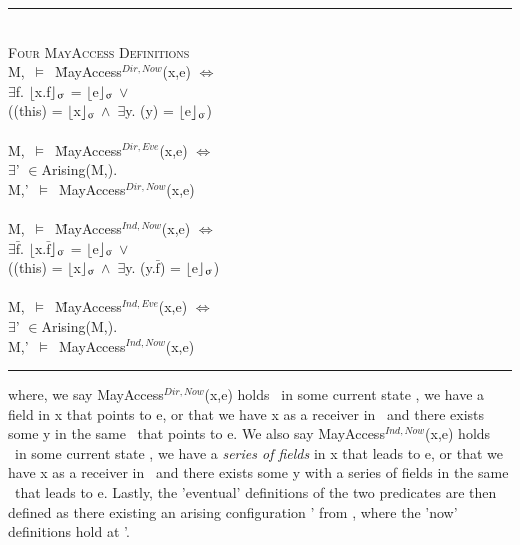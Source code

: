 \documentclass[a4paper,11pt, twoside,twocolumn]{article}
\newenvironment{logic}
{\begin{minipage}[c]{\linewidth}  \small \vspace{0.5em}\begin{tabbing}}
{\end{tabbing}\end{minipage}\vspace{0.5em}}
\newcommand{\loin}{$\in$}
\newcommand{\loexists}{$\exists$}
\newcommand{\loand}{$\land$}
\newcommand{\loor} {$\lor$}
\newcommand{\losigma}{\text{$\upsigma$}}
\newcommand{\loturns} {$\vDash$}
\newcommand{\loiff} {$\iff$}
\newcommand{\loexec}[2] {$\lfloor$#1$\rfloor _{\text{#2}}$}
\newcommand{\loconj}[1] {$\bar{\text{#1}}$}
\newcommand{\lotiff} {\textit{\textls[-20]{iff}}}
\newcommand{\hr}{\rule{\linewidth}{0.4pt}}
\begin{document}
\begin{logic}
\hr\\
\textsc{\normalsize *Four MayAccess Definitions}\\\vspace{0.5em}
M,\losigma\ \loturns\ \=MayAccess$^{Dir,Now}$(x,e) \loiff \\
\>\loexists f. \loexec{x.f}{\losigma} = \loexec{e}{\losigma}
\loor \\
\> (\losigma(this) = \loexec{x}{\losigma} \loand\ \loexists y. \losigma(y) = \loexec{e}{\losigma})\\
\\
 M,\losigma\ \loturns\ \=MayAccess$^{Dir,Eve}$(x,e) \loiff \\
\>\loexists \losigma' \loin Arising(M,\losigma).\\
\>M,\losigma'\ \loturns\ MayAccess$^{Dir,Now}$(x,e)\\
\\
M,\losigma\ \loturns\ \=MayAccess$^{Ind,Now}$(x,e) \loiff \\
\>\loexists \loconj{f}. \loexec{x.\loconj{f}}{\losigma} = \loexec{e}{\losigma}
\loor \\
\>(\losigma(this) = \loexec{x}{\losigma} \loand\ \loexists y. \losigma(y.\loconj{f}) = \loexec{e}{\losigma})\\
\\
M,\losigma\ \loturns\ \=MayAccess$^{Ind,Eve}$(x,e) \loiff \\
\>\loexists \losigma' \loin Arising(M,\losigma).\\
\>M,\losigma'\ \loturns\ MayAccess$^{Ind,Now}$(x,e)\\
\hr
\end{logic}

where, we say MayAccess$^{Dir,Now}$(x,e) holds \lotiff\ in some current state \losigma, we have a field in x that points to e, or that we have x as a receiver in \losigma\ and there exists some y in the same \losigma\ that points to e. We also say MayAccess$^{Ind,Now}$(x,e) holds \lotiff\ in some current state \losigma, we have a \textit{series of fields} in x that leads to e, or that we have x as a receiver in \losigma\ and there exists some y with a series of fields in the same \losigma\ that leads to e. Lastly, the 'eventual' definitions of the two predicates are then defined as there existing an arising configuration \losigma' from \losigma, where the 'now' definitions hold at \losigma'.\\
\end{document}
